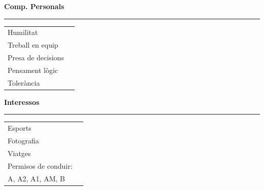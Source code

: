 \documentclass[11pt,a4paper]{article}
\newcommand{\cvsection}[1]{
    \vspace{0.5em}
    \noindent\textbf{\large #1}
    \vspace{0.5em}
    \hrule\vspace{0.5em}
}
\begin{document}
\begin{minipage}{0.25\textwidth}
    \cvsection{Comp. Personals}
    \begin{tabular}{@{}ll@{}}
        Humilitat            \\
        Treball en equip    \\
        Presa de decisions     \\
        Pensament lògic    \\
        Tolerància
    \end{tabular}
    
    \cvsection{Interessos}
    \begin{tabular}{@{}ll@{}}
        Esports       \\
        Fotografia  \\
        Viatges\\
        Permisos de conduir: \\
        A, A2, A1, AM, B \\
    \end{tabular}
\end{minipage}
\hfill
\end{document}

